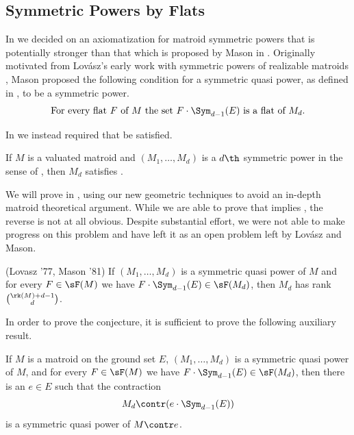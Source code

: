 \subsection{Symmetric Powers by Flats}\label{subsec:sympowByFlats}
In  we decided on an axiomatization for matroid symmetric powers that is potentially stronger than that which is proposed by Mason in \cite{MGlueing}. Originally motivated from Lov\'asz's early work with symmetric powers of realizable matroids \cite{Lovasz77}, Mason proposed the following condition for a symmetric quasi power, as defined in  , to be a symmetric power.
\begin{equation}\label{axiom:flatAxiom} 
\text{For every flat } F \text{ of } M \text{ the set } F\cdot \Sym_{d-1}(E) \text{ is a flat of } M_d.
\end{equation}

In  we instead required that  be satisfied.

\begin{proposition}\label{prop:SymprodImpliesFlats}
    If $M$ is a valuated matroid and $(M_1,\dots, M_d)$ is a $d\th$ symmetric power in the sense of , then $M_d$ satisfies .
\end{proposition}

We will prove  in , using our new geometric techniques to avoid an in-depth matroid theoretical argument. While we are able to prove that  implies , the reverse is not at all obvious. Despite substantial effort, we were not able to make progress on this problem and have left it as an open problem left by Lov\'asz and Mason.

\begin{conjecture}(Lovasz '77, Mason '81)\label{conj:flatcondition}
If $(M_1,\dots,M_d)$ is a symmetric quasi power of $M$ and for every $F\in \sF(M)$ we have $F\cdot \Sym_{d-1}(E)\in \sF(M_d)$, then $M_d$ has rank $\binom{\rk(M)+d-1}{d}$.
\end{conjecture}

In order to prove the conjecture, it is sufficient to prove the following auxiliary result.

\begin{conjecture}\label{conj:flatcondition2}
    If $M$ is a matroid on the ground set $E$, $(M_1,\dots,M_d)$ is a symmetric quasi power of $M$, and for every $F\in \sF(M)$ we have $F\cdot \Sym_{d-1}(E)\in \sF(M_d)$, then there is an $e\in E$ such that the contraction
    $$M_d\contr (e\cdot \Sym_{d-1}(E))$$
    is a symmetric quasi power of $M\contr e$.
\end{conjecture}

